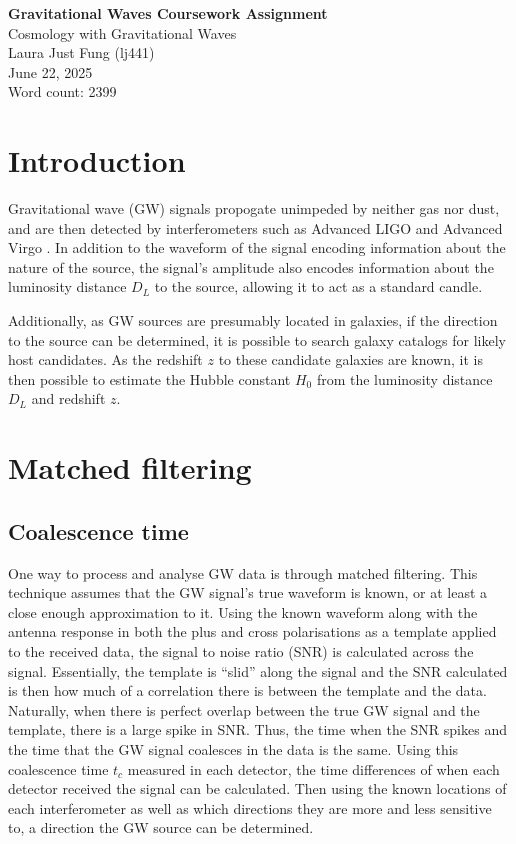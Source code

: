 \documentclass[11pt,a4paper]{article}
\begin{document}
 

\begin{center}
    \LARGE{\textbf{Gravitational Waves Coursework Assignment}}
    \\
    \Large{{Cosmology with Gravitational Waves}}
    \\
    \large{Laura Just Fung (lj441)}
    \\
    June 22, 2025
    \\
    Word count: 2399
\end{center}
\section{Introduction}
\label{sec:intro}
Gravitational wave (GW) signals propogate unimpeded by neither gas nor dust, and are then detected by interferometers such as Advanced LIGO \citep{LIGO2015} and Advanced Virgo \citep{Acernese_2014}. In addition to the waveform of the signal encoding information about the nature of the source, the signal's amplitude also encodes information about the luminosity distance $D_L$ to the source, allowing it to act as a standard candle.

Additionally, as GW sources are presumably located in galaxies, if the direction to the source can be determined, it is possible to search galaxy catalogs for likely host candidates. As the redshift $z$ to these candidate galaxies are known, it is then possible to estimate the Hubble constant $H_0$ from the luminosity distance $D_L$ and redshift $z$.

\section{Matched filtering}
\label{sec:matched_filtering}
\subsection{Coalescence time}
\label{sec:tc}
One way to process and analyse GW data is through matched filtering. This technique assumes that the GW signal's true waveform is known, or at least a close enough approximation to it. Using the known waveform along with the antenna response in both the plus and cross polarisations as a template applied to the received data, the signal to noise ratio (SNR) is calculated across the signal. Essentially, the template is ``slid'' along the signal and the SNR calculated is then how much of a correlation there is between the template and the data. Naturally, when there is perfect overlap between the true GW signal and the template, there is a large spike in SNR. Thus, the time when the SNR spikes and the time that the GW signal coalesces in the data is the same. Using this coalescence time $t_c$ measured in each detector, the time differences of when each detector received the signal can be calculated. Then using the known locations of each interferometer as well as which directions they are more and less sensitive to, a direction the GW source can be determined. 
\end{document}

